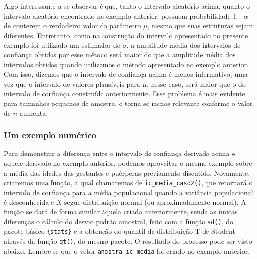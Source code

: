 \documentclass[
  letterpaper,
  DIV=11,
  numbers=noendperiod]{scrreprt}
\begin{document}
Algo interessante a se observar é que, tanto o intervalo aleatório
acima, quanto o intervalo aleatório encontrado no exemplo anterior,
possuem probabilidade 1 - \(\alpha\) de conterem o verdadeiro valor do
parâmetro \(\mu\), mesmo que suas estruturas sejam diferentes.
Entretanto, como na construção do intervalo apresentado no presente
exemplo foi utilizado um estimador de \(\sigma\), a amplitude média dos
intervalos de confiança obtidos por esse método será maior do que a
amplitude média dos intervalos obtidos quando utilizamos o método
apresentado no exemplo anterior. Com isso, dizemos que o intervalo de
confiança acima é menos informativo, uma vez que o intervalo de valores
plausíveis para \(\mu\), nesse caso, será maior que o do intervalo de
confiança construído anteriormente. Esse problema é mais evidente para
tamanhos pequenos de amostra, e torna-se menos relevante conforme o
valor de \(n\) aumenta.

\hypertarget{um-exemplo-numuxe9rico-1}{%
\subsubsection{Um exemplo numérico}\label{um-exemplo-numuxe9rico-1}}

Para demonstrar a diferença entre o intervalo de confiança derivado
acima e aquele derivado no exemplo anterior, podemos aproveitar o mesmo
exemplo sobre a média das idades das gestantes e puérperas previamente
discutido. Novamente, criaremos uma função, a qual chamaremos de
\texttt{ic\_media\_caso2()}, que retornará o intervalo de confiança para
a média populacional quando a variância populacional é desconhecida e
\(\bar{X}\) segue distribuição normal (ou aproximadamente normal). A
função se dará de forma similar àquela criada anteriormente, sendo as
únicas diferenças o cálculo do desvio padrão amostral, feito com a
função \texttt{sd()}, do pacote básico \texttt{\{stats\}} e a obtenção
do quantil da distribuição T de Student através da função \texttt{qt()},
do mesmo pacote. O resultado do processo pode ser visto abaixo.
Lembre-se que o vetor \texttt{amostra\_ic\_media} foi criado no exemplo
anterior.
\end{document}
